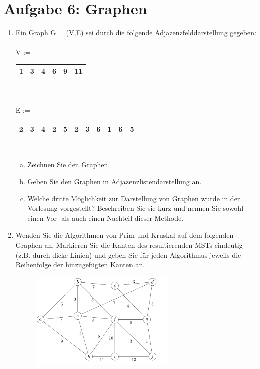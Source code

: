 \documentclass{scrartcl}
\begin{document}
\section*{Aufgabe 6: Graphen}
\begin{enumerate}[(1)]
\item Ein Graph G = (V,E) sei durch die folgende Adjazenzfelddarstellung gegeben:\\
\ \\
V := \begin{tabular}{|c|c|c|c|c|c|}
\hline 
1 & 3 & 4 & 6 & 9 & 11 \\ 
\hline 
\end{tabular}  \\
\ \\
E := \begin{tabular}{|c|c|c|c|c|c|c|c|c|c|c|}
\hline 
2 & 3 & 4 & 2 & 5 & 2 & 3 & 6 & 1 & 6 & 5 \\ 
\hline 
\end{tabular}\\
\begin{enumerate}[(a)]
	\item Zeichnen Sie den Graphen.
	\item Geben Sie den Graphen in Adjazenzlistendarstellung an.
	\item Welche dritte Möglichkeit zur Darstellung von Graphen wurde in der Vorlesung vorgestellt? Beschreiben Sie sie kurz und nennen Sie sowohl einen Vor- als auch einen Nachteil dieser Methode.
\end{enumerate} 

\item Wenden Sie die Algorithmen von Prim und Kruskal auf dem folgenden Graphen an. Markieren Sie die Kanten des resultierenden MSTs eindeutig (z.B. durch dicke Linien) und geben Sie für jeden Algorithmus jeweils die Reihenfolge der hinzugefügten Kanten an.
\begin{figure}[h]
\centering
\includegraphics[width=0.66\textwidth]{mst_graph.png}
\end{figure}


\end{enumerate}
\end{document}
